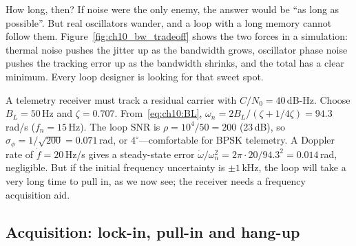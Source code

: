 How long, then? If noise were the only enemy, the answer would be ``as long as possible''. But
real oscillators wander, and a loop with a long memory cannot follow them. Figure~\ref{fig:ch10_bw_tradeoff}
shows the two forces in a simulation: thermal noise pushes the jitter up as the bandwidth grows,
oscillator phase noise pushes the tracking error up as the bandwidth shrinks, and the total has a
clear minimum. Every loop designer is looking for that sweet spot.


\begin{worked}
A telemetry receiver must track a residual carrier with $C/N_0=40$\,dB-Hz. Choose
$B_L=50$\,Hz and $\zeta=0.707$. From~\eqref{eq:ch10:BL}, $\omega_n=2B_L/(\zeta+1/4\zeta)=94.3$\,rad/s
($f_n=15$\,Hz). The loop SNR is $\rho=10^4/50=200$ (23\,dB), so $\sigma_\phi=1/\sqrt{200}=0.071$\,rad,
or $4^\circ$---comfortable for BPSK telemetry. A Doppler rate of $\dot f=20$\,Hz/s gives a
steady-state error $\dot\omega/\omega_n^2=2\pi\cdot20/94.3^2=0.014$\,rad, negligible. But if the
initial frequency uncertainty is $\pm1$\,kHz, the loop will take a very long time to pull in, as we
now see; the receiver needs a frequency acquisition aid.
\end{worked}

\subsection{Acquisition: lock-in, pull-in and hang-up}

